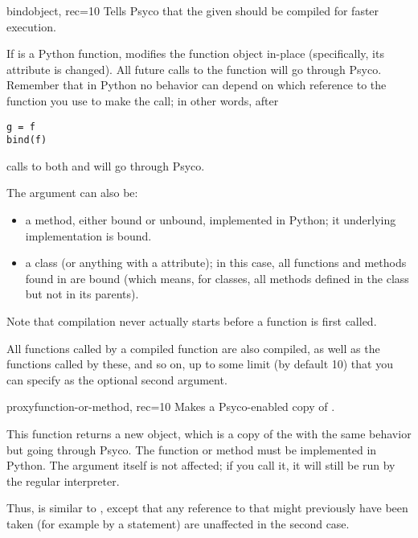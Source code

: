\documentclass{manual}
\begin{document}
\begin{funcdesc}{bind}{object, rec=10}
  Tells Psyco that the given  should be compiled for faster execution.

  If  is a Python function,   modifies the function object in-place (specifically, its  attribute is changed).  All future calls to the function will go through Psyco.  Remember that in Python no behavior can depend on which reference to the function you use to make the call; in other words, after

\begin{verbatim}
g = f
bind(f)
\end{verbatim}

  calls to both  and  will go through Psyco.

  The  argument can also be:
  \begin{itemize}
    \item a method, either bound or unbound, implemented in Python; it underlying implementation is bound.
    \item a class (or anything with a  attribute); in this case, all functions and methods found in  are bound (which means, for classes, all methods defined in the class but not in its parents).
  \end{itemize}

  Note that compilation never actually starts before a function is first called.

  All functions called by a compiled function are also compiled, as well as the functions called by these, and so on, up to some limit (by default 10) that you can specify as the optional second argument.
\end{funcdesc}

\begin{funcdesc}{proxy}{function-or-method, rec=10}
  Makes a Psyco-enabled copy of .

  This function returns a new object, which is a copy of the  with the same behavior but going through Psyco.  The function or method must be implemented in Python.  The argument itself is not affected; if you call it, it will still be run by the regular interpreter.

  Thus,  is similar to , except that any reference to  that might previously have been taken (for example by a  statement) are unaffected in the second case.
\end{funcdesc}
\end{document}
